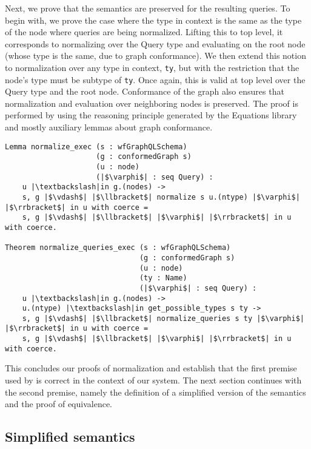 Next, we prove that the semantics are preserved for the resulting queries. To begin with, we prove the case where the type in context is the same as the type of the node where queries are being normalized. Lifting this to top level, it corresponds to normalizing over the Query type and evaluating on the root node (whose type is the same, due to graph conformance). We then extend this notion to normalization over any type in context, \texttt{ty}, but with the restriction that the node's type must be subtype of \texttt{ty}. Once again, this is valid at top level over the Query type and the root node. Conformance of the graph also ensures that normalization and evaluation over neighboring nodes is preserved. The proof is performed by using the reasoning principle generated by the Equations library and mostly auxiliary lemmas about graph conformance.

\begin{verbatim}
Lemma normalize_exec (s : wfGraphQLSchema)
                     (g : conformedGraph s)
                     (u : node)
                     (|$\varphi$| : seq Query) :
    u |\textbackslash|in g.(nodes) ->
    s, g |$\vdash$| |$\llbracket$| normalize s u.(ntype) |$\varphi$| |$\rrbracket$| in u with coerce =
    s, g |$\vdash$| |$\llbracket$| |$\varphi$| |$\rrbracket$| in u with coerce.

Theorem normalize_queries_exec (s : wfGraphQLSchema)
                               (g : conformedGraph s)
                               (u : node)
                               (ty : Name)
                               (|$\varphi$| : seq Query) :
    u |\textbackslash|in g.(nodes) ->
    u.(ntype) |\textbackslash|in get_possible_types s ty ->
    s, g |$\vdash$| |$\llbracket$| normalize_queries s ty |$\varphi$| |$\rrbracket$| in u with coerce =
    s, g |$\vdash$| |$\llbracket$| |$\varphi$| |$\rrbracket$| in u with coerce.

\end{verbatim}

This concludes our proofs of normalization and establish that the first premise used by \HP{} is correct in the context of our system.
The next section continues with the second premise, namely the definition of a simplified version of the semantics
and the proof of equivalence.

\subsection{Simplified semantics}

